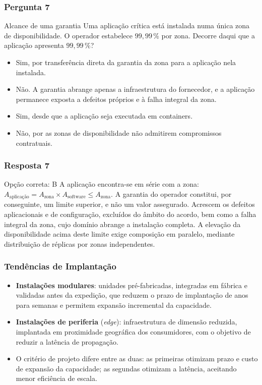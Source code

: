 \documentclass[aspectratio=169]{beamer}
\begin{document}
\begin{frame}
\frametitle{Pergunta 7}
\begin{pergunta}{Alcance de uma garantia}
Uma aplicação crítica está instalada numa única zona de disponibilidade. O operador estabelece $99{,}99\,\%$ por zona. Decorre daqui que a aplicação apresenta $99{,}99\,\%$?
\begin{itemize}
    \item[A)] Sim, por transferência direta da garantia da zona para a aplicação nela instalada.
    \item[B)] Não. A garantia abrange apenas a infraestrutura do fornecedor, e a aplicação permanece exposta a defeitos próprios e à falha integral da zona.
    \item[C)] Sim, desde que a aplicação seja executada em containers.
    \item[D)] Não, por as zonas de disponibilidade não admitirem compromissos contratuais.
\end{itemize}
\end{pergunta}
\end{frame}

\begin{frame}
\frametitle{Resposta 7}
\begin{resposta}{Opção correta: B}
A aplicação encontra-se em série com a zona: $A_{\text{aplicação}} = A_{\text{zona}} \times A_{\text{software}} \le A_{\text{zona}}$. A garantia do operador constitui, por conseguinte, um limite superior, e não um valor assegurado. Acrescem os defeitos aplicacionais e de configuração, excluídos do âmbito do acordo, bem como a falha integral da zona, cujo domínio abrange a instalação completa. A elevação da disponibilidade acima deste limite exige composição em paralelo, mediante distribuição de réplicas por zonas independentes.
\end{resposta}
\end{frame}

\begin{frame}
\frametitle{Tendências de Implantação}
\begin{itemize}
    \setlength\itemsep{0.4cm}
    \item \textbf{Instalações modulares}: unidades pré-fabricadas, integradas em fábrica e validadas antes da expedição, que reduzem o prazo de implantação de anos para semanas e permitem expansão incremental da capacidade.
    \item \textbf{Instalações de periferia} (\emph{edge}): infraestrutura de dimensão reduzida, implantada em proximidade geográfica dos consumidores, com o objetivo de reduzir a latência de propagação.
    \item O critério de projeto difere entre as duas: as primeiras otimizam prazo e custo de expansão da capacidade; as segundas otimizam a latência, aceitando menor eficiência de escala.
\end{itemize}
\end{frame}
\end{document}
